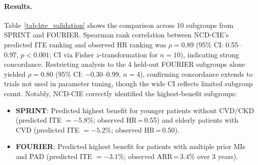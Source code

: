 \documentclass[runningheads]{llncs}
\begin{document}
\paragraph{Results.}
Table~\ref{tab:hte_validation} shows the comparison across 10
subgroups from SPRINT and FOURIER.
Spearman rank correlation between NCD-CIE's predicted ITE ranking
and observed HR ranking was $\rho = 0.89$ (95\% CI: 0.55--0.97,
$p < 0.001$; CI via Fisher $z$-transformation for $n = 10$),
indicating strong concordance.
Restricting analysis to the 4 held-out FOURIER subgroups alone
yielded $\rho = 0.80$ (95\% CI: $-$0.30--0.99, $n = 4$), confirming
concordance extends to trials not used in parameter tuning, though
the wide CI reflects limited subgroup count.
Notably, NCD-CIE correctly identified the highest-benefit subgroups:
\begin{itemize}
\item \textbf{SPRINT}: Predicted highest benefit for younger
  patients without CVD/CKD (predicted ITE $= -5.8\%$; observed
  HR\,=\,0.55) and elderly patients with CVD (predicted ITE $= -5.2\%$;
  observed HR\,=\,0.50).
\item \textbf{FOURIER}: Predicted highest benefit for patients with
  multiple prior MIs and PAD (predicted ITE $= -3.1\%$; observed
  ARR\,=\,3.4\% over 3 years).
\end{itemize}
\end{document}
